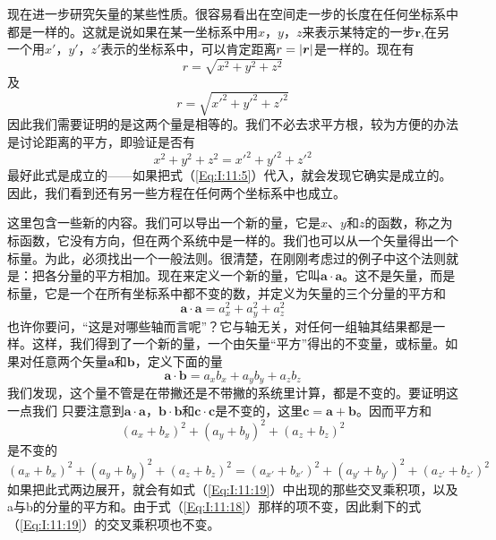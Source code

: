 现在进一步研究矢量的某些性质。很容易看出在空间走一步的长度在任何坐标系中都是一样的。这就是说如果在某一坐标系中用$x$，$y$，$z$来表示某特定的一步$\boldsymbol{r}$,在另一个用$x'$，$y'$，$z'$表示的坐标系中，可以肯定距离$r=\lvert\boldsymbol{r}\rvert$是一样的。现在有
\begin{equation*}
    r=\sqrt{x^2+y^2+z^2}
\end{equation*}
及
\begin{equation*}
    r=\sqrt{x'^2+y'^2+z'^2}
\end{equation*}
因此我们需要证明的是这两个量是相等的。我们不必去求平方根，较为方便的办法是讨论距离的平方，即验证是否有
\begin{equation}
    \label{Eq:I:11:17}
    x^2+y^2+z^2=x'^2+y'^2+z'^2
\end{equation}
最好此式是成立的——如果把式（\ref{Eq:I:11:5}）代入，就会发现它确实是成立的。因此，我们看到还有另一些方程在任何两个坐标系中也成立。

这里包含一些新的内容。我们可以导出一个新的量，它是$x$、$y$和$z$的函数，称之为标函数，它没有方向，但在两个系统中是一样的。我们也可以从一个矢量得出一个标量。为此，必须找出一个一般法则。很清楚，在刚刚考虑过的例子中这个法则就是：把各分量的平方相加。现在来定义一个新的量，它叫$\boldsymbol{a} \cdot \boldsymbol{a}$。这不是矢量，而是标量，它是一个在所有坐标系中都不变的数，并定义为矢量的三个分量的平方和
\begin{equation}
    \label{Eq:I:11:18}
    \boldsymbol{a} \cdot \boldsymbol{a}=a_x^2+a_y^2+a_z^2
\end{equation}
也许你要问，“这是对哪些轴而言呢”？它与轴无关，对任何一组轴其结果都是一样。这样，我们得到了一个新的量，一个由矢量“平方”得出的不变量，或标量。如果对任意两个矢量$\boldsymbol{a}$和$\boldsymbol{b}$，定义下面的量
\begin{equation}
    \label{Eq:I:11:19}
    \boldsymbol{a} \cdot \boldsymbol{b}=a_xb_x+a_yb_y+a_zb_z
\end{equation}
我们发现，这个量不管是在带撇还是不带撇的系统里计算，都是不变的。要证明这一点我们
只要注意到$\boldsymbol{a} \cdot \boldsymbol{a}$，$\boldsymbol{b} \cdot \boldsymbol{b}$和$\boldsymbol{c} \cdot \boldsymbol{c}$是不变的，这里$\boldsymbol{c}=\boldsymbol{a}+\boldsymbol{b}$。因而平方和
\begin{equation*}
    (a_x+b_x)^2+(a_y+b_y)^2+(a_z+b_z)^2
\end{equation*}
是不变的
\begin{equation}
    \label{Eq:I:11:20}
    (a_x+b_x)^2+(a_y+b_y)^2+(a_z+b_z)^2=(a_{x'}+b_{x'})^2+(a_{y'}+b_{y'})^2+(a_{z'}+b_{z'})^2
\end{equation}
如果把此式两边展开，就会有如式（\ref{Eq:I:11:19}）中出现的那些交叉乘积项，以及a与b的分量的平方和。由于式（\ref{Eq:I:11:18}）那样的项不变，因此剩下的式（\ref{Eq:I:11:19}）的交叉乘积项也不变。

